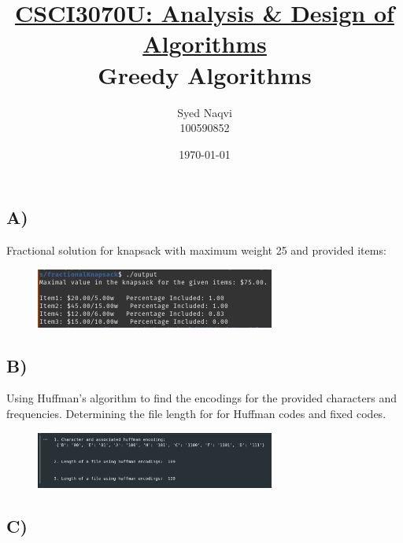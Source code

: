 \documentclass{article}
\title{\textbf{\underline{CSCI3070U: Analysis \& Design of Algorithms}\\Greedy Algorithms}}
\author{Syed Naqvi\\100590852}
\date{\today}
\begin{document}
    \maketitle
    
    \subsection*{A)}

    \begin{center}
        \begin{minipage}[t]{0.9\textwidth}
            Fractional solution for knapsack with maximum weight 25 and provided items:
            \begin{figure}[H]
                \centering
                \includegraphics[width=0.7\textwidth, height=0.1\textheight]{./parta.png}
            \end{figure}
        \end{minipage}
    \end{center}

    \subsection*{B)}

    \begin{center}
        \begin{minipage}[t]{0.9\textwidth}
            Using Huffman's algorithm to find the encodings for the provided characters and frequencies.
            Determining the file length for for Huffman codes and fixed codes. 
            \begin{figure}[H]
                \centering
                \includegraphics[width=0.7\textwidth, height=0.1\textheight]{./partb.png}
            \end{figure}
        \end{minipage}
    \end{center}

    \subsection*{C)}
\end{document}

